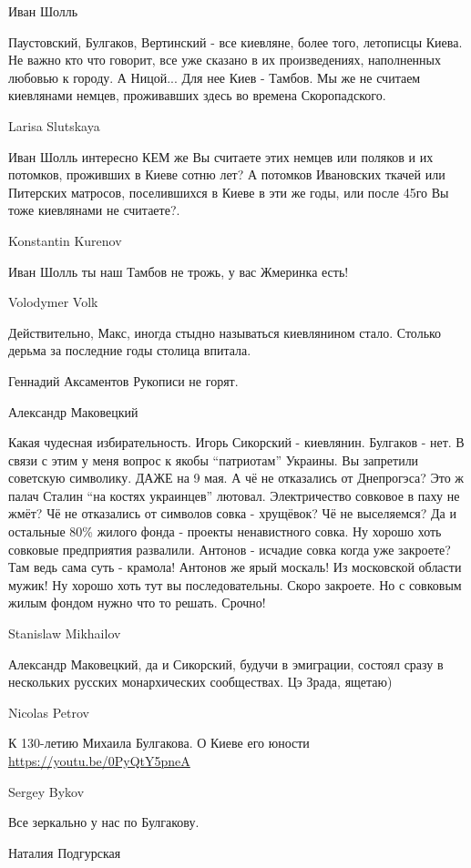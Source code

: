 Иван Шолль

Паустовский, Булгаков, Вертинский - все киевляне, более того, летописцы Киева.
Не важно кто что говорит, все уже сказано в их произведениях, наполненных
любовью к городу. А Ницой... Для нее Киев - Тамбов. Мы же не считаем киевлянами
немцев, проживавших здесь во времена Скоропадского.

Larisa Slutskaya

Иван Шолль интересно КЕМ же Вы считаете этих немцев или поляков и их потомков,
проживших в Киеве сотню лет? А потомков Ивановских ткачей или Питерских
матросов, поселившихся в Киеве в эти же годы, или после 45го Вы тоже киевлянами
не считаете?.

Konstantin Kurenov

Иван Шолль ты наш Тамбов не трожь, у вас Жмеринка есть!

Volodymer Volk

Действительно, Макс, иногда стыдно называться киевлянином стало. Столько дерьма
за последние годы столица впитала.

Геннадий Аксаментов
Рукописи не горят.

Александр Маковецкий

Какая чудесная избирательность. Игорь Сикорский - киевлянин. Булгаков - нет. В
связи с этим у меня вопрос к якобы \enquote{патриотам} Украины. Вы запретили советскую
символику. ДАЖЕ на 9 мая. А чё не отказались от Днепрогэса? Это ж палач Сталин
\enquote{на костях украинцев} лютовал. Электричество совковое в паху не жмёт? Чё не
отказались от символов совка - хрущёвок? Чё не выселяемся? Да и остальные 80\%
жилого фонда - проекты ненавистного совка. Ну хорошо хоть совковые предприятия
развалили. Антонов - исчадие совка когда уже закроете? Там ведь сама суть -
крамола! Антонов же ярый москаль! Из московской области мужик! Ну хорошо хоть
тут вы последовательны. Скоро закроете. Но с совковым жилым фондом нужно что то
решать. Срочно!

Stanislaw Mikhailov

Александр Маковецкий, да и Сикорский, будучи в эмиграции, состоял сразу в
нескольких русских монархических сообществах. Цэ Зрада, ящетаю)

Nicolas Petrov

К 130-летию Михаила Булгакова.
О Киеве его юности
\url{https://youtu.be/0PyQtY5pneA}

Sergey Bykov

Все зеркально у нас по Булгакову.

Наталия Подгурская

